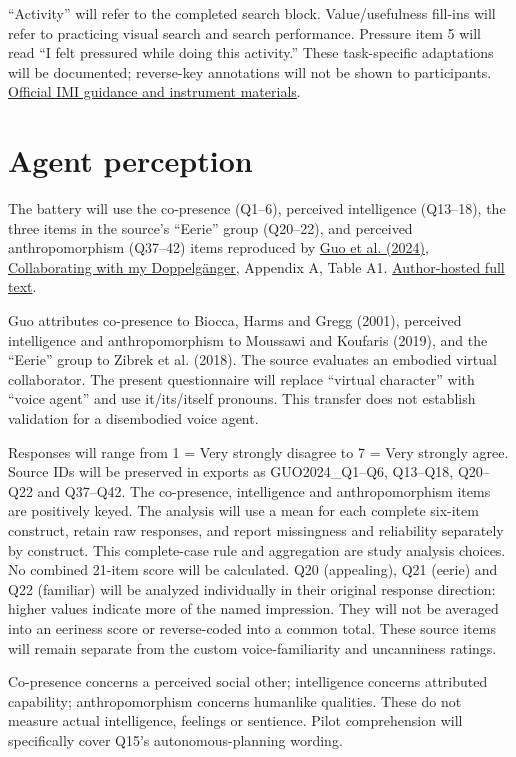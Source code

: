 \documentclass[11pt,letterpaper]{article}
\begin{document}
``Activity'' will refer to the completed search block. Value/usefulness fill-ins will refer to practicing visual search and search performance. Pressure item 5 will read ``I felt pressured while doing this activity.'' These task-specific adaptations will be documented; reverse-key annotations will not be shown to participants.
\href{https://selfdeterminationtheory.org/intrinsic-motivation-inventory/}{Official IMI guidance and instrument materials}.

\section{Agent perception}
The battery will use the co-presence (Q1--6), perceived intelligence (Q13--18), the three items in the source's ``Eerie'' group (Q20--22), and perceived anthropomorphism (Q37--42) items reproduced by \href{https://doi.org/10.1145/3651288}{Guo et al. (2024), Collaborating with my Doppelg\"anger}, Appendix A, Table A1. \href{https://web.ics.purdue.edu/~cmousas/papers/jour24-PACMCGIT-SelfSimiarAppearanceVoice.pdf}{Author-hosted full text}.

Guo attributes co-presence to Biocca, Harms and Gregg (2001), perceived intelligence and anthropomorphism to Moussawi and Koufaris (2019), and the ``Eerie'' group to Zibrek et al. (2018). The source evaluates an embodied virtual collaborator. The present questionnaire will replace ``virtual character'' with ``voice agent'' and use it/its/itself pronouns. This transfer does not establish validation for a disembodied voice agent.

Responses will range from 1 = Very strongly disagree to 7 = Very strongly agree. Source IDs will be preserved in exports as GUO2024\_Q1--Q6, Q13--Q18, Q20--Q22 and Q37--Q42. The co-presence, intelligence and anthropomorphism items are positively keyed. The analysis will use a mean for each complete six-item construct, retain raw responses, and report missingness and reliability separately by construct. This complete-case rule and aggregation are study analysis choices. No combined 21-item score will be calculated. Q20 (appealing), Q21 (eerie) and Q22 (familiar) will be analyzed individually in their original response direction: higher values indicate more of the named impression. They will not be averaged into an eeriness score or reverse-coded into a common total. These source items will remain separate from the custom voice-familiarity and uncanniness ratings.

Co-presence concerns a perceived social other; intelligence concerns attributed capability; anthropomorphism concerns humanlike qualities. These do not measure actual intelligence, feelings or sentience. Pilot comprehension will specifically cover Q15's autonomous-planning wording.
\end{document}
